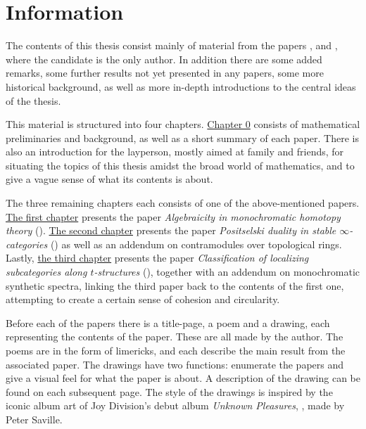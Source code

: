 
\section*{Information}

The contents of this thesis consist mainly of material from the papers \cite{aambo_2024_algebraicity}, \cite{aambo_2024_positselski} and \cite{aambo_2024_localizing}, where the candidate is the only author. In addition there are some added remarks, some further results not yet presented in any papers, some more historical background, as well as more in-depth introductions to the central ideas of the thesis. 

This material is structured into four chapters. \hyperref[ch0]{Chapter 0} consists of mathematical preliminaries and background, as well as a short summary of each paper. There is also an introduction for the layperson, mostly aimed at family and friends, for situating the topics of this thesis amidst the broad world of mathematics, and to give a vague sense of what its contents is about.  

The three remaining chapters each consists of one of the above-mentioned papers. \hyperref[ch1]{The first chapter} presents the paper \emph{Algebraicity in monochromatic homotopy theory} (\cite{aambo_2024_algebraicity}). \hyperref[ch2]{The second chapter} presents the paper \emph{Positselski duality in stable $\infty$-categories} (\cite{aambo_2024_positselski}) as well as an addendum on contramodules over topological rings. Lastly, \hyperref[ch3]{the third chapter} presents the paper \emph{Classification of localizing subcategories along $t$-structures} (\cite{aambo_2024_localizing}), together with an addendum on monochromatic synthetic spectra, linking the third paper back to the contents of the first one, attempting to create a certain sense of cohesion and circularity. 

Before each of the papers there is a title-page, a poem and a drawing, each representing the contents of the paper. These are all made by the author. The poems are in the form of limericks, and each describe the main result from the associated paper. The drawings have two functions: enumerate the papers and give a visual feel for what the paper is about. A description of the drawing can be found on each subsequent page. The style of the drawings is inspired by the iconic album art of Joy Division's debut album \emph{Unknown Pleasures}, \cite{joy-division_79}, made by Peter Saville. 
